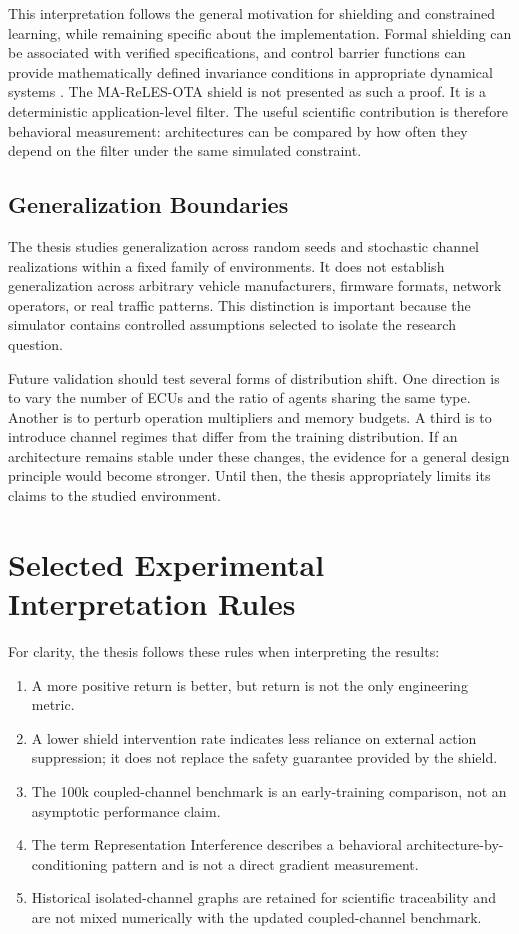 \documentclass{iutbscthesis}
\begin{document}
\begin{appendices}
This interpretation follows the general motivation for shielding and constrained learning, while remaining specific about the implementation. Formal shielding can be associated with verified specifications, and control barrier functions can provide mathematically defined invariance conditions in appropriate dynamical systems \parencite{alshiekh2018shielding,ames2019cbf}. The MA-ReLES-OTA shield is not presented as such a proof. It is a deterministic application-level filter. The useful scientific contribution is therefore behavioral measurement: architectures can be compared by how often they depend on the filter under the same simulated constraint.

\section{Generalization Boundaries}
The thesis studies generalization across random seeds and stochastic channel realizations within a fixed family of environments. It does not establish generalization across arbitrary vehicle manufacturers, firmware formats, network operators, or real traffic patterns. This distinction is important because the simulator contains controlled assumptions selected to isolate the research question.

Future validation should test several forms of distribution shift. One direction is to vary the number of ECUs and the ratio of agents sharing the same type. Another is to perturb operation multipliers and memory budgets. A third is to introduce channel regimes that differ from the training distribution. If an architecture remains stable under these changes, the evidence for a general design principle would become stronger. Until then, the thesis appropriately limits its claims to the studied environment.

\chapter{Selected Experimental Interpretation Rules}

For clarity, the thesis follows these rules when interpreting the results:
\begin{enumerate}[leftmargin=*]
    \item A more positive return is better, but return is not the only engineering metric.
    \item A lower shield intervention rate indicates less reliance on external action suppression; it does not replace the safety guarantee provided by the shield.
    \item The 100k coupled-channel benchmark is an early-training comparison, not an asymptotic performance claim.
    \item The term Representation Interference describes a behavioral architecture-by-conditioning pattern and is not a direct gradient measurement.
    \item Historical isolated-channel graphs are retained for scientific traceability and are not mixed numerically with the updated coupled-channel benchmark.
\end{enumerate}

\end{appendices}
\end{document}
